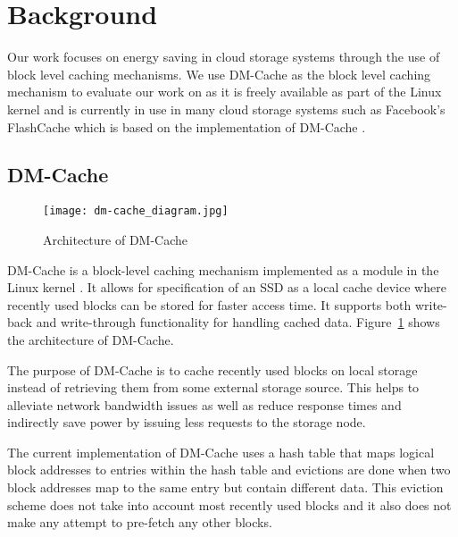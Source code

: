 \section{Background}

Our work focuses on energy saving in cloud storage systems through the use of
block level caching mechanisms. We use DM-Cache as the block level caching
mechanism to evaluate our work on as it is freely available as part of the Linux
kernel and is currently in use in many cloud storage systems such as Facebook's
FlashCache which is based on the implementation of DM-Cache \cite{flashcache}.

\subsection{DM-Cache}

\begin{figure}[htb]
  \caption{Architecture of DM-Cache}
  \centering \texttt{[image: dm-cache\_diagram.jpg]}
  \label{fig:dm-cache}
\end{figure}

DM-Cache is a block-level caching mechanism implemented as a module in the Linux
kernel \cite{DM-Cache}. It allows for specification of an SSD as a local cache
device where recently used blocks can be stored for faster access time. It
supports both write-back and write-through functionality for handling cached
data. Figure~\ref{fig:dm-cache} shows the architecture of DM-Cache.

The purpose of DM-Cache is to cache recently used blocks on local storage
instead of retrieving them from some external storage source. This helps to
alleviate network bandwidth issues as well as reduce response times and
indirectly save power by issuing less requests to the storage node.

The current implementation of DM-Cache uses a hash table that maps logical block
addresses to entries within the hash table and evictions are done when two block
addresses map to the same entry but contain different data. This eviction scheme
does not take into account most recently used blocks and it also does not make
any attempt to pre-fetch any other blocks.
